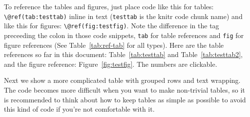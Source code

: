 \documentclass[12pt]{article}\usepackage[]{graphicx}\usepackage[]{color}
\begin{document}
To reference the tables and figures, just place code like this for tables: \texttt{\textbackslash{}@ref(tab:testtab)} inline in text (\texttt{testtab} is the knitr code chunk name) and like this for figures: \texttt{\textbackslash{}@ref(fig:testfig)}. Note the difference in the tag preceeding the colon in those code snippets, \texttt{tab} for table references and \texttt{fig} for figure references (See Table~\ref{tab:ref-tab} for all types). Here are the table references so far in this document: Table~\ref{tab:testtab} and Table~\ref{tab:testtab2}, and the figure reference: Figure~\ref{fig:testfig}. The numbers are clickable.

Next we show a more complicated table with grouped rows and text wrapping. The code becomes more difficult when you want to make non-trivial tables, so it is recommended to think about how to keep tables as simple as possible to avoid this kind of code if you're not comfortable with it.
\end{document}
